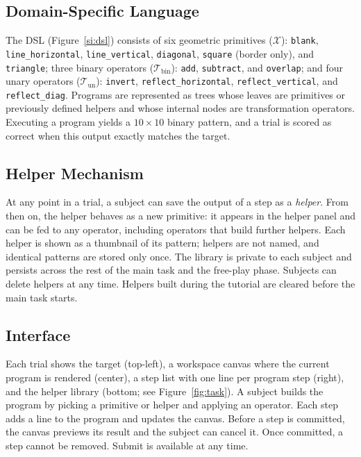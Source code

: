 \documentclass{article}
\begin{document}
\subsection{Domain-Specific Language}
The DSL (Figure~\ref{si:dsl}) consists of six geometric primitives
($\mathcal{X}$): \texttt{blank}, \texttt{line\_horizontal},
\texttt{line\_vertical}, \texttt{diagonal}, \texttt{square} (border
only), and \texttt{triangle}; three binary operators
($\mathcal{T}_{\mathrm{bin}}$): \texttt{add}, \texttt{subtract}, and
\texttt{overlap}; and four unary operators
($\mathcal{T}_{\mathrm{un}}$): \texttt{invert},
\texttt{reflect\_horizontal}, \texttt{reflect\_vertical}, and
\texttt{reflect\_diag}. Programs are represented as trees whose leaves
are primitives or previously defined helpers and whose internal nodes
are transformation operators. Executing a program yields a $10\times10$
binary pattern, and a trial is scored as correct when this output exactly
matches the target.

\subsection{Helper Mechanism}
At any point in a trial, a subject can save the output of a step as a
\emph{helper}. From then on, the helper behaves as a new primitive: it
appears in the helper panel and can be fed to any operator, including
operators that build further helpers. Each helper is shown as a
thumbnail of its pattern; helpers are not named, and identical patterns
are stored only once. The library is private to each subject and
persists across the rest of the main task and the free-play phase.
Subjects can delete helpers at any time. Helpers built during the
tutorial are cleared before the main task starts.

\subsection{Interface}
Each trial shows the target (top-left), a workspace canvas where the
current program is rendered (center), a step list with one line per
program step (right), and the helper library (bottom; see
Figure~\ref{fig:task}). A subject builds the program by picking a
primitive or helper and applying an operator. Each step adds a line to
the program and updates the canvas. Before a step is committed, the
canvas previews its result and the subject can cancel it. Once
committed, a step cannot be removed. Submit is available at any time.
\end{document}
